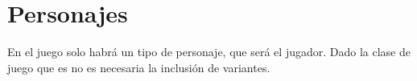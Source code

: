 \section{Personajes}
En el juego solo habrá un tipo de personaje, que será el jugador. Dado la clase de juego que es no es necesaria la inclusión de variantes.